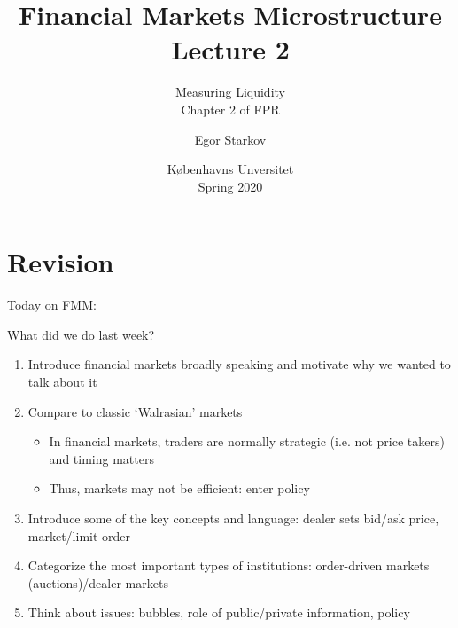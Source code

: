 




\title{Financial Markets Microstructure \\ Lecture 2}

\subtitle{Measuring Liquidity \\
Chapter 2 of FPR}

\author{Egor Starkov}

\date{K{\o}benhavns Unversitet \\
	Spring 2020}




\frame[plain]{\titlepage}
\addtocounter{framenumber}{-1}


\section{Revision}

\begin{frame}{Today on FMM:}
	\tableofcontents[currentsection]
\end{frame}


\begin{frame}{What did we do last week?}
	\begin{enumerate}
		\item Introduce financial markets broadly speaking and motivate why we wanted to talk about it
		\item Compare to classic `Walrasian' markets
		\begin{itemize}
			\item In financial markets, traders are normally strategic (i.e. not price takers) and timing matters
			\item Thus, markets may not be efficient: enter policy
		\end{itemize}
		\item Introduce some of the key concepts and language: dealer sets bid/ask price, market/limit order
		\item Categorize the most important types of institutions:  order-driven markets (auctions)/dealer markets
		\item Think about issues: bubbles, role of public/private information, policy
	\end{enumerate}
\end{frame}


